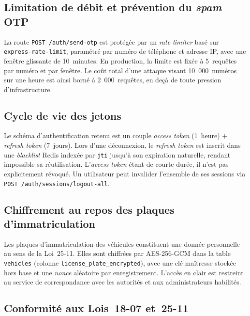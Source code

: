 \documentclass[12pt, a4paper, oneside]{report}
\begin{document}
\subsection{Limitation de débit et prévention du \textit{spam} OTP}

La route \texttt{POST /auth/send-otp} est protégée par un \textit{rate limiter} basé sur \texttt{express-rate-limit}, paramétré par numéro de téléphone et adresse IP, avec une fenêtre glissante de 10~minutes. En production, la limite est fixée à 5~requêtes par numéro et par fenêtre. Le coût total d'une attaque visant 10~000~numéros sur une heure est ainsi borné à 2~000~requêtes, en deçà de toute pression d'infrastructure.

\subsection{Cycle de vie des jetons}

Le schéma d'authentification retenu est un couple \textit{access token} (1~heure) + \textit{refresh token} (7~jours). Lors d'une déconnexion, le \textit{refresh token} est inscrit dans une \textit{blacklist} Redis indexée par \texttt{jti} jusqu'à son expiration naturelle, rendant impossible sa réutilisation. L'\textit{access token} étant de courte durée, il n'est pas explicitement révoqué. Un utilisateur peut invalider l'ensemble de ses sessions via \texttt{POST /auth/sessions/logout-all}.

\subsection{Chiffrement au repos des plaques d'immatriculation}

Les plaques d'immatriculation des véhicules constituent une donnée personnelle au sens de la Loi~25-11. Elles sont chiffrées par AES-256-GCM dans la table \texttt{vehicles} (colonne \texttt{license\_plate\_encrypted}), avec une clé maîtresse stockée hors base et une \textit{nonce} aléatoire par enregistrement. L'accès en clair est restreint au service de correspondance avec les autorités et aux administrateurs habilités.

\subsection{Conformité aux Lois~18-07 et~25-11}
\end{document}
